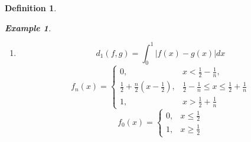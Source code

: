 \documentclass{article}
\newtheorem*{property}{Property}
\newtheorem*{definition}{Definition}
\newtheorem*{example}{Example}
\begin{document}
\begin{definition}
\begin{example}
\begin{enumerate}
\begin{property}
                $\|f\|_0=\sup_{0 \le x \le 1}{|f(x)|}, (C(\bigl[0, 1\bigr]), \|f_0\|)$ is a Banach space.
                \begin{proof}
                    Let $\{f_n\}$ be a Cauchy sequence, $\forall \epsilon > 0, \exists N > 0$, s.t.
                    $d_0(f_n, f_m) = \sup_{0 \le x \le 1}|f_n(x) - f_m(x)| < \epsilon$.
                    Then for any fixed $x \in [0, 1]$, the sequence (of scalars) $\{f_n(x)\}$ is a Cauchy sequence in $\mathbb{R}$.
                    It follows that there exists $f_0(x)$ s.t. $f_n(x) \rightarrow f_0(x)$(use Completeness of $\mathbb{R}$).
                    Since $|f_n(x) - f_m(x)| < \epsilon$. letting $m \rightarrow \infty$ we get
                    $|f_n(x) - f_0(x)| \le \epsilon, \forall n > N, \forall x \in X$.
                    So the sequence of functions $\{f_n(x)\}$ converges uniformly to $f_0(x)$, 
                    because $\forall x \in X$.
                    By results in mathmatical analysis, $f_0$ is continuous and 
                    $f_n \rightarrow f_0(\sup_{0 \le x \le 1}{|f_n(x) - f_0(x)|} < \epsilon, \forall n > N)$ 
                    in $(C([0, 1]), d_0)$
                    (Finally, each \(f_n\) is continuous, then the uniform limit of continuous functions is continuous, 
                    \(f\in C([0,1])\).
                    We have thus found a limit \(f\in C([0,1])\) of the Cauchy sequence \(\{f_n\}\) in the metric \(d_0\).  
                    This shows \((C([0,1]),d_0)\) is complete. See the proof in appendix)
                \end{proof}
            \end{property}
            \item \[
                d_1(f, g) = \int_{0}^{1}{|f(x) - g(x)|dx}
            \]
            \[
                f_n(x) = 
                \begin{cases}
                    0, & x < \frac{1}{2} - \frac{1}{n}, \\
                    \frac{1}{2} + \frac{n}{2}(x - \frac{1}{2}), & \frac{1}{2} - \frac{1}{n} \le x \le \frac{1}{2} + \frac{1}{n} \\
                    1, & x > \frac{1}{2} + \frac{1}{n}
                \end{cases}
            \]
            \[
                f_0(x) =
                    \begin{cases}
                        0, & x \le \frac{1}{2} \\
                        1, & x \ge \frac{1}{2}
                    \end{cases}
\]
\end{enumerate}
\end{example}
\end{definition}
\end{document}
